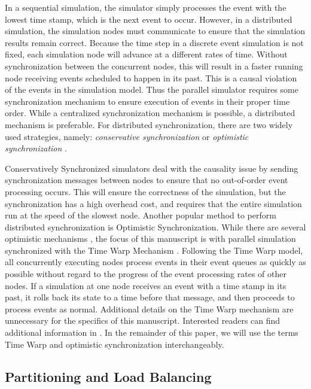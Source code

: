 \documentclass{wscpaperproc}
\begin{document}
In a sequential simulation, the simulator simply processes the event with the lowest time stamp, which is the next event to occur. However, in a distributed simulation, the simulation nodes must communicate to ensure that the simulation results remain correct. Because the time step in a discrete event simulation is not fixed, each simulation node will advance at a different rates of time. Without synchronization between the concurrent nodes, this will result in a faster running node receiving events scheduled to happen in its past. This is a causal violation of the events in the simulation model. Thus the parallel simulator requires some synchronization mechanism to ensure execution of events in their proper time order. While a centralized synchronization mechanism is possible, a distributed mechanism is preferable. For distributed synchronization, there are two widely used strategies, namely: \emph{conservative synchronization} or \emph{optimistic synchronization} \cite{fujimoto-90}.

Conservatively Synchronized simulators deal with the causality issue by sending synchronization messages between nodes to ensure that no out-of-order event processing occurs. This will ensure the correctness of the simulation, but the synchronization has a high overhead cost, and requires that the entire simulation run at the speed of the slowest node. Another popular method to perform distributed synchronization is Optimistic Synchronization. While there are several optimistic mechanisms \cite{chandy-89,jefferson-85}, the focus of this manuscript is with parallel simulation synchronized with the Time Warp Mechanism \cite{jefferson-85}. Following the Time Warp model, all concurrently executing nodes process events in their event queues as quickly as possible without regard to the progress of the event processing rates of other nodes. If a simulation at one node receives an event with a time stamp in its past, it rolls back its state to a time before that message, and then proceeds to process events as normal. Additional details on the Time Warp mechanism are unnecessary for the specifics of this manuscript. Interested readers can find additional information in \cite{fujimoto-90,jefferson-85}. In the remainder of this paper, we will use the terms Time Warp and optimistic synchronization interchangeably.

\subsection{Partitioning and Load Balancing}
\end{document}
